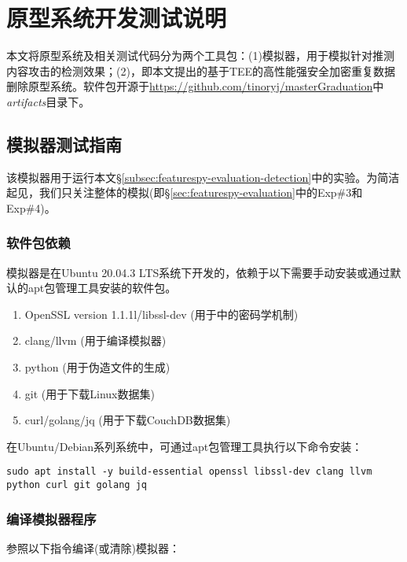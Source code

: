 \chapter{原型系统开发测试说明}
\label{chapter:appendix}

本文将原型系统及相关测试代码分为两个工具包：(1)\sysnameF 模拟器，用于模拟针对推测内容攻击的检测效果；(2)\prototype ，即本文提出的基于TEE的高性能强安全加密重复数据删除原型系统。软件包开源于\url{https://github.com/tinoryj/masterGraduation}中{\em artifacts}目录下。



\section{\sysnameF 模拟器测试指南}
该模拟器用于运行本文\S\ref{subsec:featurespy-evaluation-detection}中的实验。为简洁起见，我们只关注整体\sysnameF 的模拟(即\S\ref{sec:featurespy-evaluation}中的Exp\#3和Exp\#4)。

\subsection*{软件包依赖}

\sysnameF 模拟器是在Ubuntu 20.04.3 LTS系统下开发的，依赖于以下需要手动安装或通过默认的apt包管理工具安装的软件包。

\begin{enumerate}[leftmargin=0em]
  \item OpenSSL version 1.1.1l/libssl-dev (用于\sysnameF 中的密码学机制)
  \item clang/llvm (用于编译模拟器)
  \item python (用于伪造文件的生成)
  \item git (用于下载Linux数据集)
  \item curl/golang/jq (用于下载CouchDB数据集)
\end{enumerate}

在Ubuntu/Debian系列系统中，可通过apt包管理工具执行以下命令安装：

\begin{lstlisting}[style=shell]
sudo apt install -y build-essential openssl libssl-dev clang llvm python curl git golang jq
\end{lstlisting}

\subsection*{编译模拟器程序}

参照以下指令编译(或清除)\sysnameF 模拟器：

